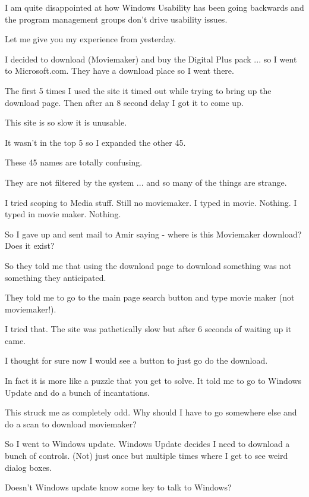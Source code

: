 \documentclass[letterpaper,10pt]{texMemo}
\begin{document}
\maketitle

I am quite disappointed at how Windows Usability has been going backwards and the program management groups don't drive usability issues.

Let me give you my experience from yesterday.

I decided to download (Moviemaker) and buy the Digital Plus pack ... so I went to Microsoft.com. They have a download place so I went there.

The first 5 times I used the site it timed out while trying to bring up the download page. Then after an 8 second delay I got it to come up.

This site is so slow it is unusable.

It wasn't in the top 5 so I expanded the other 45.

These 45 names are totally confusing.

They are not filtered by the system ... and so many of the things are strange.

I tried scoping to Media stuff. Still no moviemaker. I typed in movie. Nothing. I typed in movie maker. Nothing.

So I gave up and sent mail to Amir saying - where is this Moviemaker download? Does it exist?

So they told me that using the download page to download something was not something they anticipated.

They told me to go to the main page search button and type movie maker (not moviemaker!).

I tried that. The site was pathetically slow but after 6 seconds of waiting up it came.

I thought for sure now I would see a button to just go do the download.

In fact it is more like a puzzle that you get to solve. It told me to go to Windows Update and do a bunch of incantations.

This struck me as completely odd. Why should I have to go somewhere else and do a scan to download moviemaker?

So I went to Windows update. Windows Update decides I need to download a bunch of controls. (Not) just once but multiple times where I get to see weird dialog boxes.

Doesn't Windows update know some key to talk to Windows?
\end{document}
